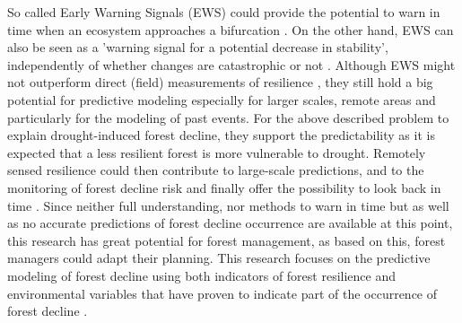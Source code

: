 So called Early Warning Signals (EWS) could provide the potential to warn in time when an ecosystem approaches a bifurcation \citep{dakos2014}. On the other hand, EWS can also be seen as a 'warning signal for a potential decrease in stability', independently of whether changes are catastrophic or not \citep{kefi2013}. Although EWS might not outperform direct (field) measurements of resilience \citep{vbelzen2017}, they still hold a big potential for predictive modeling especially for larger scales, remote areas and particularly for the modeling of past events. For the above described problem to explain drought-induced forest decline, they support the predictability as it is expected that a less resilient forest is more vulnerable to drought. Remotely sensed resilience could then contribute to large-scale predictions, and to the monitoring of forest decline risk and finally offer the possibility to look back in time \citep{verbesselt2016}. Since neither full understanding, nor methods to warn in time but as well as no accurate predictions of forest decline occurrence are available at this point, this research has great potential for forest management, as based on this, forest managers could adapt their planning. This research focuses on the predictive modeling of forest decline using both indicators of forest resilience and environmental variables that have proven to indicate part of the occurrence of forest decline \citep{chaparro2017}.\\
